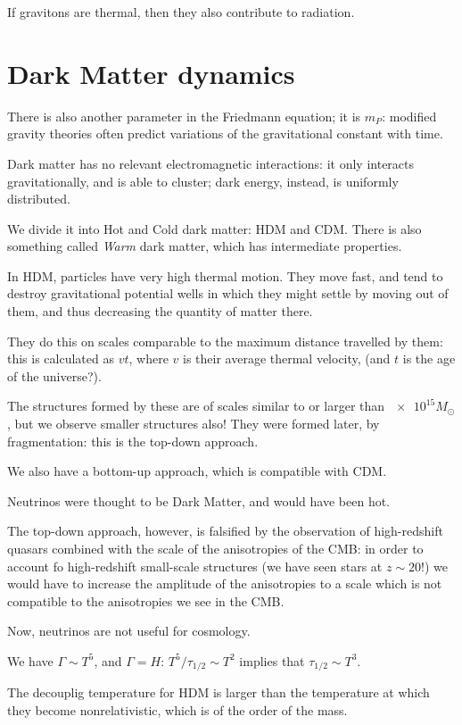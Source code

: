 \documentclass[main.tex]{subfiles}
\begin{document}
If gravitons are thermal, then they also contribute to radiation. 

\section{Dark Matter dynamics}

There is also another parameter in the Friedmann equation; it is \(m_P\): modified gravity theories often predict variations of the gravitational constant with time. 

Dark matter has no relevant electromagnetic interactions: it only interacts gravitationally, and is able to cluster; dark energy, instead, is uniformly distributed. 

We divide it into Hot and Cold dark matter: HDM and CDM. 
There is also something called \emph{Warm} dark matter, which has intermediate properties.

In HDM, particles have very high thermal motion. They move fast, and tend to destroy gravitational potential wells in which they might settle by moving out of them, and thus decreasing the quantity of matter there. 

They do this on scales comparable to the maximum distance travelled by them: this is calculated as \(vt\), where \(v\) is their average thermal velocity, (and \(t\) is the age of the universe?). 

The structures formed by these are of scales similar  to or larger than \(\num{e15} M_{\odot}\), but we observe smaller structures also! They were formed later, by fragmentation: this is the top-down approach. 

We also have a bottom-up approach, which is compatible with CDM. 

Neutrinos were thought to be Dark Matter, and would have been hot. 

The top-down approach, however, is falsified by the observation of high-redshift quasars combined with the scale of the anisotropies of the CMB: in order to account fo high-redshift small-scale structures (we have seen stars at \(z \sim 20\)!) we would have to increase the amplitude of the anisotropies to a scale which is not compatible to the anisotropies we see in the CMB. 

Now, neutrinos are not useful for cosmology. 

We have \(\Gamma \sim T^{5}\), and \(\Gamma = H\): 
\(T^{5} / \tau_{1/2} \sim T^2\) implies that \(\tau_{1/2} \sim T^{3}\). 

The decouplig temperature for HDM is larger than the temperature at which they become nonrelativistic, which is of the order of the mass. 
\end{document}

